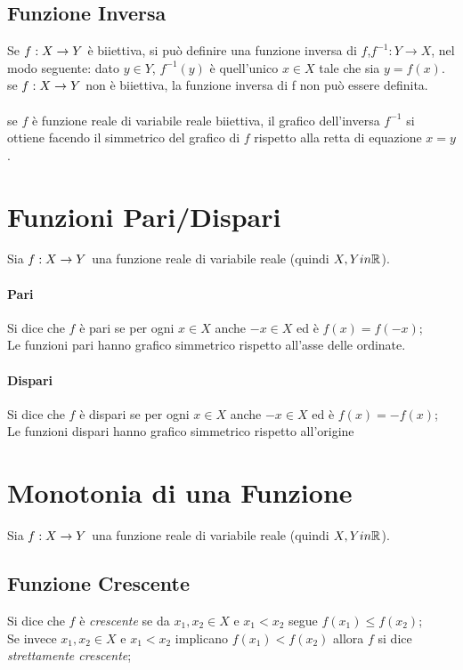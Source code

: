 \documentclass[12pt, a4paper, openany]{book}
\begin{document}
\subsection*{Funzione Inversa}
Se $f: X \rightarrow Y$ è biiettiva, si può definire una funzione inversa di $f$,$f^{-1} : Y \rightarrow X$, nel modo seguente:
dato $y \in Y$, $f^{-1}(y)$ è quell'unico $x \in X$ tale che sia $y = f(x)$.
se $f: X \rightarrow Y$ non è biiettiva, la funzione inversa di f non può essere definita.
\paragraph*{} se $f$ è funzione reale di variabile reale biiettiva, il grafico dell'inversa $f^{-1}$ si ottiene facendo il simmetrico del grafico di $f$ rispetto alla retta di equazione $x=y$.

\section*{Funzioni Pari/Dispari}
Sia $f: X \rightarrow Y$ una funzione reale di variabile reale (quindi $X, Y in \mathbb{R}$).
\paragraph*{Pari}
Si dice che $f$ è pari se per ogni $x \in X$ anche $-x \in X$ ed è $f(x) = f(-x)$;
\\Le funzioni pari hanno grafico simmetrico rispetto all'asse delle ordinate.
\paragraph*{Dispari}
Si dice che $f$ è dispari se per ogni $x \in X$ anche $-x \in X$ ed è $f(x) = -f(x)$;
\\Le funzioni dispari hanno grafico simmetrico rispetto all'origine

\section{Monotonia di una Funzione}
Sia $f: X \rightarrow Y$ una funzione reale di variabile reale (quindi $X, Y in \mathbb{R}$).

\subsection*{Funzione Crescente}
Si dice che $f$ è \emph{crescente} se da $x_1, x_2 \in X$ e $x_1 < x_2$ segue $f(x_1) \leq f(x_2)$;
\\Se invece $x_1, x_2 \in X$ e $x_1 < x_2$ implicano $f(x_1) < f(x_2)$ allora $f$ si dice \emph{strettamente crescente};
\end{document}
